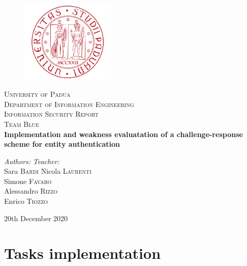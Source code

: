 \documentclass{report}
\begin{document}
\begin{titlepage}
\begin{center}
\vspace*{0.8cm}
\begin{figure}[H]
\centering
\includegraphics[width=0.4\textwidth]{logo_uni}
\end{figure}
\LARGE{\textsc{University of Padua}}\\
\vspace*{0.1cm}
\Large{\textsc{Department of Information Engineering}}\\
\vspace*{1.8cm}
\Large{\textsc{Information Security Report}}\\
\vspace*{0.1cm}
\Large{\textsc{Team Blue}}\\
\vspace*{0.8cm}
\huge{\textbf{Implementation and weakness evaluatation of a challenge-response scheme for entity authentication}}\\
\vspace*{1cm}
\end{center}
\large{\textit{Authors:}}
\hfill
\large{\textit{Teacher:}} \\
\large{Sara \textsc{Bardi}}
\hfill
\large{Nicola \textsc{Laurenti}}\\
\large{Simone \textsc{Favaro}}\\
\large{Alessandro \textsc{Rizzo}}\\
\large{Enrico \textsc{Tiozzo}}\\

\begin{center}
\large{20th December 2020}\\
\end{center}
\end{titlepage}
\pagebreak

\setcounter{page}{1}






\chapter*{Tasks implementation}
\end{document}
